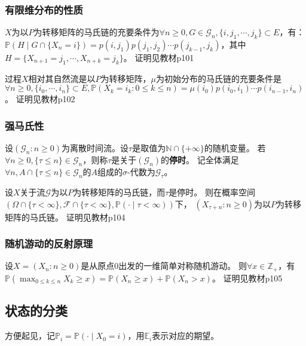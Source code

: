 \documentclass[main]{subfiles}
\begin{document}
\subsubsection{有限维分布的性质}
\begin{theorem}\label{the:4.2.5}
  \(X\)为以\(P\)为转移矩阵的马氏链的充要条件为\(\forall n \geq 0,G \in \mathcal{G}_n,\{i,j_1,\cdots,j_k\} \subset E\)，有：
  \(\mathbb{P}(H \mid G \cap \{X_n=i\})=p(i,j_1)p(j_1,j_2)\cdots p(j_{k-1},j_k)\)，其中\(H=\{X_{n+1}=j_1,\cdots,X_{n+k}=j_k\}\)。
  证明见教材p101
\end{theorem}
\begin{theorem}\label{the:4.2.7}
  过程\(X\)相对其自然流是以\(P\)为转移矩阵，\(\mu\)为初始分布的马氏链的充要条件是
  \(\forall n \geq 0,\{i_0,\cdots,i_n\} \subset E,\mathbb{P}(X_k=i_k:0 \leq k \leq n)=\mu(i_0)p(i_0,i_1)\cdots p(i_{n-1},i_n)\)。
  证明见教材p102
\end{theorem}
\subsubsection{强马氏性}
\begin{definition}\label{def:stopping_time}
  设\((\mathcal{G}_n:n \geq 0)\)为离散时间流。设\(\tau\)是取值为\(\mathbb{N} \cap \{+\infty\}\)的随机变量。
  若\(\forall n \geq 0,\{\tau \leq n\}\in \mathcal{G}_n\)，则称\(\tau\)是关于\((\mathcal{G}_n)\)的\textbf{停时}。
  记全体满足\(\forall n,A \cap \{\tau \leq n\} \in \mathcal{G}_n\)的\(A\)组成的\(\sigma\)-代数为\(\mathcal{G}_\tau\)。
\end{definition}
\begin{theorem}
  设\(X\)关于流\(\mathcal{G}\)为以\(P\)为转移矩阵的马氏链，而\(\tau\)是停时。
  则在概率空间\((\Omega \cap \{\tau<\infty\},\mathcal{F} \cap \{\tau<\infty\},\mathbb{P}(\cdot \mid \tau<\infty))\)下，
  \((X_{\tau+n}:n \geq 0)\)为以\(P\)为转移矩阵的马氏链。
  证明见教材p104
\end{theorem}
\subsubsection{随机游动的反射原理}
\begin{theorem}\label{the:reflect}
  设\(X=(X_n:n \geq 0)\)是从原点\(0\)出发的一维简单对称随机游动。
  则\(\forall x \in \mathbb{Z}_+\)，有
  \(\mathbb{P}\left(\max_{0 \leq k \leq n} X_k \geq x\right)=\mathbb{P}(X_n \geq x)+\mathbb{P}(X_n > x)\)。
  证明见教材p105
\end{theorem}
\subsection{状态的分类}
方便起见，记\(\mathbb{P}_i=\mathbb{P}(\cdot \mid X_0=i)\)，用\(\mathbb{E}_i\)表示对应的期望。
\ifSubfilesClassLoaded{%
  \printindex}{%
}
\end{document}

